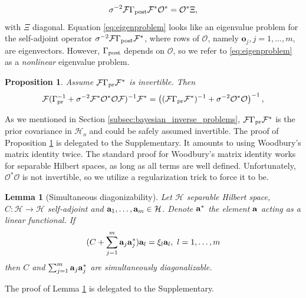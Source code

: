 \documentclass[ba]{imsart}
\newcommand{\hil}{\mathcal{H}}
\newcommand{\hilo}{\mathcal{H}_o}
\newcommand{\obs}{\mathcal{O}}
\newcommand{\fwd}{\mathcal{F}}
\newcommand{\meas}{\mathbf{o}}
\theoremstyle{plain}
\newtheorem{lemma}[theorem]{Lemma}
\newtheorem{proposition}[theorem]{Proposition}
\theoremstyle{definition}
\theoremstyle{remark}
\begin{document}
\begin{equation}\label{eq:eigenproblem}
  \sigma^{-2}\fwd \postcov \fwd^* \obs^* = \obs^* \Xi,
\end{equation}
with $\Xi$ diagonal. Equation \eqref{eq:eigenproblem} looks like an
eigenvalue problem for the self-adjoint operator $\sigma^{-2}\fwd
\postcov \fwd^*$, where rows of $\obs$, namely $\meas_j,j=1,\dots, m$,
are eigenvectors. However, $\Gamma_{\textup{post}}$ depends on $\obs$, so we refer
to \eqref{eq:eigenproblem} as a \emph{nonlinear} eigenvalue problem.


\begin{proposition}\label{prop:twice_woodbury}
  Assume $\fwd \prcov \fwd^*$ is invertible. Then
  \begin{align*}
    \begin{split}
      \fwd( \prcov^{-1} + \sigma^{-2}  \fwd^* \obs^* \obs \fwd )^{-1} \fwd^* 
= \left ( (\fwd\prcov\fwd^*)^{-1} + \sigma^{-2}  \obs^* \obs \right )^{-1},
    \end{split}
  \end{align*}  
\end{proposition}

As we mentioned in Section \ref{subsec:bayesian_inverse_problems},
$\fwd \prcov \fwd^*$ is the prior covariance in $\hilo$ and could be
safely assumed invertible. The proof of Proposition
\ref{prop:twice_woodbury} is delegated to the Supplementary. It
amounts to using Woodbury's matrix identity twice. The standard proof
for Woodbury's matrix identity works for separable Hilbert spaces, as
long as all terms are well defined. Unfortunately, $\obs^*\obs$ is not
invertible, so we utilize a regularization trick to force it to be.

\begin{lemma}[Simultaneous diagonizability]\label{lemma:sim_diag}
  Let $\hil$ separable Hilbert space, $C:\hil \to \hil$ self-adjoint
  and $\func_1,\dots,\func_m \in \hil$. Denote $\mathbf{a}^*$ the element
  $\mathbf{a}$ acting as a linear functional. If
  \begin{equation*}
   (C + \sum_{j=1}^m \func_j\func_j^*) \func_l = \xi_l \func_l,\ l = 1,\dots,m
  \end{equation*}
  then $C$ and $\sum_{j=1}^m \mathbf{a}_j \mathbf{a}_j^*$ are simultaneously
  diagonalizable.
\end{lemma}
The proof of Lemma \ref{lemma:sim_diag} is delegated to the
Supplementary.
\end{document}
